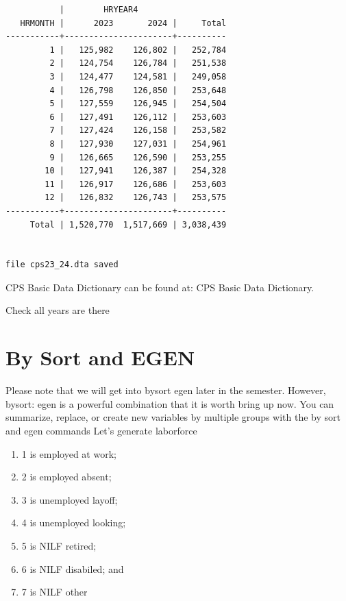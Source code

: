 \documentclass[
]{book}
\providecommand{\tightlist}{%
  \setlength{\itemsep}{0pt}\setlength{\parskip}{0pt}}
\begin{document}
\begin{verbatim}
           |        HRYEAR4
   HRMONTH |      2023       2024 |     Total
-----------+----------------------+----------
         1 |   125,982    126,802 |   252,784 
         2 |   124,754    126,784 |   251,538 
         3 |   124,477    124,581 |   249,058 
         4 |   126,798    126,850 |   253,648 
         5 |   127,559    126,945 |   254,504 
         6 |   127,491    126,112 |   253,603 
         7 |   127,424    126,158 |   253,582 
         8 |   127,930    127,031 |   254,961 
         9 |   126,665    126,590 |   253,255 
        10 |   127,941    126,387 |   254,328 
        11 |   126,917    126,686 |   253,603 
        12 |   126,832    126,743 |   253,575 
-----------+----------------------+----------
     Total | 1,520,770  1,517,669 | 3,038,439 


file cps23_24.dta saved
\end{verbatim}

CPS Basic Data Dictionary can be found at:
CPS Basic Data Dictionary.

Check all years are there

\section{By Sort and EGEN}\label{by-sort-and-egen}

Please note that we will get into bysort egen later in the semester. However, bysort: egen is a powerful combination that it is worth bring up now. You can summarize, replace, or create new variables by multiple groups
with the by sort and egen commands
Let's generate laborforce

\begin{enumerate}
\def\labelenumi{\arabic{enumi}.}
\tightlist
\item
  1 is employed at work;
\item
  2 is employed absent;
\item
  3 is unemployed layoff;
\item
  4 is unemployed looking;
\item
  5 is NILF retired;
\item
  6 is NILF disabiled; and
\item
  7 is NILF other
\end{enumerate}
\end{document}
